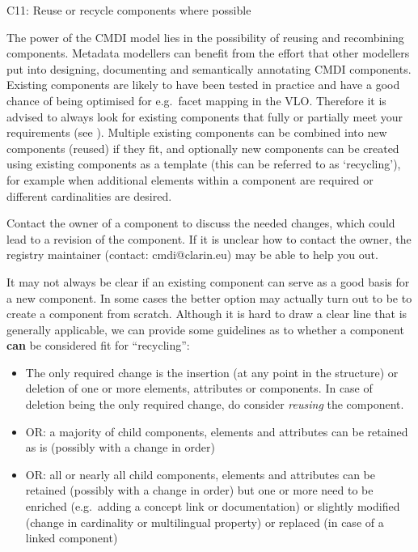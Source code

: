 C11: Reuse or recycle components where possible

 

The power of the CMDI model lies in the possibility of reusing and recombining components. Metadata modellers can benefit from the effort that other modellers put into designing, documenting and semantically annotating CMDI components. Existing components
 are likely to have been tested in practice and have a good chance of being optimised for e.g.~facet mapping in the VLO. Therefore it is advised to always look for existing components that fully or partially meet your requirements (see ). Multiple existing components can be combined into new components (reused) if they fit, and optionally new components can be created using existing components as a template (this can be referred to as `recycling'), for example when additional elements within a component are required or different cardinalities are desired.

Contact the owner of a component to discuss the needed changes, which could lead to a revision of the component. If it is unclear how to contact the owner, the registry maintainer (contact: cmdi@clarin.eu) may be able to help you out.

It may not always be clear if an existing component can serve as a good basis for a new component. In some cases the better option may actually turn out to be to create a component from scratch. Although it is hard to draw a clear line that is generally applicable, we can provide some guidelines as to whether a component \textbf{can} be considered fit for
``recycling'':

\begin{itemize}
\tightlist
\item
  The only required change is the insertion (at any point in the structure) or deletion of one or more elements, attributes or components. In case of deletion being the only required change, do consider \emph{reusing} the component.
\item
  OR: a majority of child components, elements and attributes can be retained as is (possibly with a change in order)
\item
  OR: all or nearly all child components, elements and attributes can be retained (possibly with a change in order) but one or more need to be enriched (e.g.~adding a concept link or documentation) or slightly modified (change in cardinality or multilingual property) or replaced (in case of a linked component)
\end{itemize}

